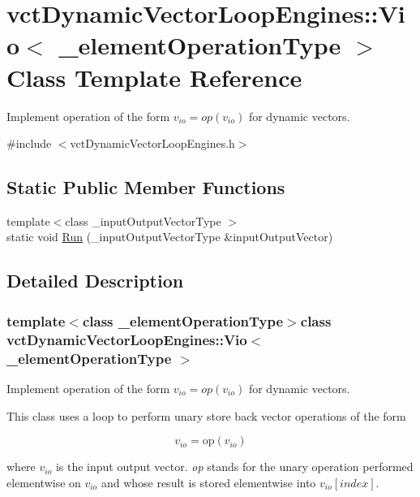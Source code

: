\hypertarget{classvct_dynamic_vector_loop_engines_1_1_vio}{}\section{vct\+Dynamic\+Vector\+Loop\+Engines\+:\+:Vio$<$ \+\_\+element\+Operation\+Type $>$ Class Template Reference}
\label{classvct_dynamic_vector_loop_engines_1_1_vio}


Implement operation of the form $v_{io} = op(v_{io})$ for dynamic vectors.  




{\ttfamily \#include $<$vct\+Dynamic\+Vector\+Loop\+Engines.\+h$>$}

\subsection*{Static Public Member Functions}
\begin{DoxyCompactItemize}
\item 
{\footnotesize template$<$class \+\_\+input\+Output\+Vector\+Type $>$ }\\static void \hyperlink{classvct_dynamic_vector_loop_engines_1_1_vio_ab83688c8c6588ee10dcc096a1bf10aa2}{Run} (\+\_\+input\+Output\+Vector\+Type \&input\+Output\+Vector)
\end{DoxyCompactItemize}


\subsection{Detailed Description}
\subsubsection*{template$<$class \+\_\+element\+Operation\+Type$>$class vct\+Dynamic\+Vector\+Loop\+Engines\+::\+Vio$<$ \+\_\+element\+Operation\+Type $>$}

Implement operation of the form $v_{io} = op(v_{io})$ for dynamic vectors. 

This class uses a loop to perform unary store back vector operations of the form

\[ v_{io} = \mathrm{op}(v_{io}) \]

where $v_{io}$ is the input output vector. {\itshape op} stands for the unary operation performed elementwise on $v_{io}$ and whose result is stored elementwise into $v_{io}[index]$.



